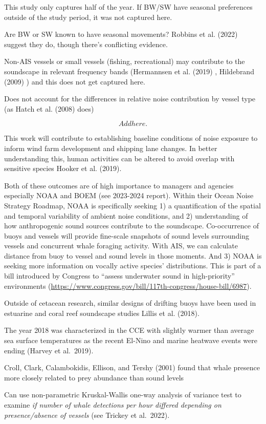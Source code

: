 \documentclass[
]{article}
\begin{document}
This study only captures half of the year. If BW/SW have seasonal
preferences outside of the study period, it was not captured here.

Are BW or SW known to have seasonal movements? Robbins et al. (2022)
suggest they do, though there's conflicting evidence.

Non-AIS vessels or small vessels (fishing, recreational) may contribute
to the soundscape in relevant frequency bands (Hermannsen et al. (2019)
, Hildebrand (2009) ) and this does not get captured here.

Does not account for the differences in relative noise contribution by
vessel type (as Hatch et al. (2008) does)

\[Add here.\]

This work will contribute to establishing baseline conditions of noise
exposure to inform wind farm development and shipping lane changes. In
better understanding this, human activities can be altered to avoid
overlap with sensitive species Hooker et al. (2019).

Both of these outcomes are of high importance to managers and agencies
especially NOAA and BOEM (see 2023-2024 report). Within their Ocean
Noise Strategy Roadmap, NOAA is specifically seeking 1) a quantification
of the spatial and temporal variability of ambient noise conditions, and
2) understanding of how anthropogenic sound sources contribute to the
soundscape. Co-occurrence of buoys and vessels will provide fine-scale
snapshots of sound levels surrounding vessels and concurrent whale
foraging activity. With AIS, we can calculate distance from buoy to
vessel and sound levels in those moments. And 3) NOAA is seeking more
information on vocally active species' distributions. This is part of a
bill introduced by Congress to ``assess underwater sound in
high-priority'' environments
(\url{https://www.congress.gov/bill/117th-congress/house-bill/6987}).

Outside of cetacean research, similar designs of drifting buoys have
been used in estuarine and coral reef soundscape studies Lillis et al.
(2018).

The year 2018 was characterized in the CCE with slightly warmer than
average sea surface temperatures as the recent El-Nino and marine
heatwave events were ending (Harvey et al.~2019).

Croll, Clark, Calambokidis, Ellison, and Tershy (2001) found that whale
presence more closely related to prey abundance than sound levels

Can use non-parametric Kruskal-Wallis one-way analysis of variance test
to examine \emph{if number of whale detections per hour differed
depending on presence/absence of vessels} (see Trickey et al.~2022).
\end{document}
